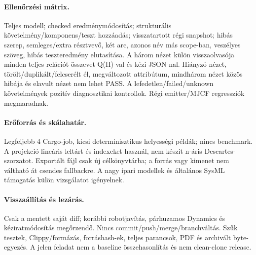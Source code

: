 \documentclass[11pt,a4paper]{article}
\begin{document}
\paragraph{Ellenőrzési mátrix.} Teljes modell; checked eredménymódosítás; strukturális követelmény/komponens/teszt hozzáadás; visszatartott régi snapshot; hibás szerep, semleges/extra résztvevő, két arc, azonos név más scope-ban, veszélyes szöveg, hibás teszteredmény elutasítása. A három nézet külön visszaolvasója minden teljes relációt összevet Q(H)-val és kézi JSON-nal. Hiányzó nézet, törölt/duplikált/felcserélt él, megváltozott attribútum, mindhárom nézet közös hibája és elavult nézet nem lehet PASS. A lefedetlen/failed/unknown követelmények pozitív diagnosztikai kontrollok. Régi emitter/MJCF regressziók megmaradnak.
\paragraph{Erőforrás és skálahatár.} Legfeljebb 4 Cargo-job, kicsi determinisztikus helyességi példák; nincs benchmark. A projekció lineáris leltárt és indexeket használ, nem készít n-áris Descartes-szorzatot. Exportált fájl csak új célkönyvtárba; a forrás vagy kimenet nem váltható át csendes fallbackre. A nagy ipari modellek és általános SysML támogatás külön vizsgálatot igényelnek.
\paragraph{Visszaállítás és lezárás.} Csak a mentett saját diff; korábbi robotjavítás, párhuzamos Dynamics és kéziratmódosítás megőrzendő. Nincs commit/push/merge/branchváltás. Szűk tesztek, Clippy/formázás, forráshash-ek, teljes parancsok, PDF és archivált byte-egyezés. A jelen feladat nem a baseline összehasonlítás és nem clean-clone release.

\end{document}

